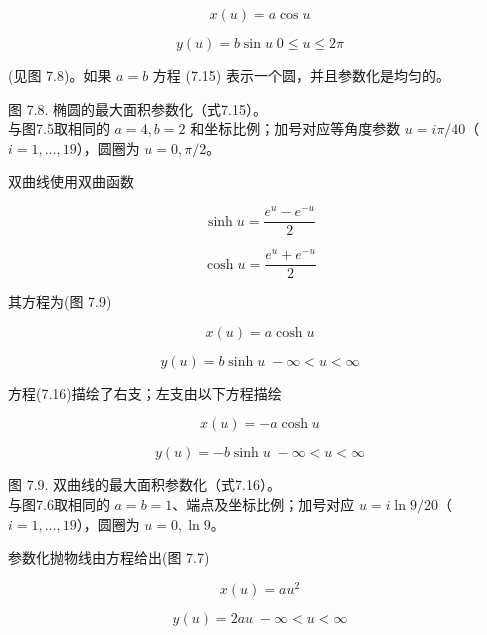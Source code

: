 \documentclass[../main.tex]{subfiles}
\begin{document}
\[
x\left( u\right)  = a\cos u
\]

\[
y\left( u\right)  = b\sin u\;0 \leq  u \leq  {2\pi } \tag{7.15}
\]

(见图 7.8)。如果 \(a = b\) 方程 (7.15) 表示一个圆，并且参数化是均匀的。

\begin{center}
\begin{minipage}{16cm}
\vspace*{.6\baselineskip}
\centering
{}
\par\smallskip
图 7.8. 椭圆的最大面积参数化（式7.15）。\\
与图7.5取相同的 $a=4,b=2$ 和坐标比例；加号对应等角度参数 $u=i\pi/40$（$i=1,\ldots,19$），圆圈为 $u=0,\pi/2$。
\end{minipage}
\end{center}

双曲线使用双曲函数

\[
\sinh u = \frac{{e}^{u} - {e}^{-u}}{2}
\]

\[
\cosh u = \frac{{e}^{u} + {e}^{-u}}{2}
\]

其方程为(图 7.9)

\[
x\left( u\right)  = a\cosh u
\]

\[
y\left( u\right)  = b\sinh u\; - \infty  < u < \infty  \tag{7.16}
\]

方程(7.16)描绘了右支；左支由以下方程描绘

\[
x\left( u\right)  =  - a\cosh u
\]

\[
y\left( u\right)  =  - b\sinh u\; - \infty  < u < \infty
\]





\begin{center}
\begin{minipage}{16cm}
\vspace*{.6\baselineskip}
\centering
{}
\par\smallskip
图 7.9. 双曲线的最大面积参数化（式7.16）。\\
与图7.6取相同的 $a=b=1$、端点及坐标比例；加号对应 $u=i\ln9/20$（$i=1,\ldots,19$），圆圈为 $u=0,\ln9$。
\end{minipage}
\end{center}

参数化抛物线由方程给出(图 7.7)

\[
x\left( u\right)  = a{u}^{2}
\]

\[
y\left( u\right)  = {2au}\; - \infty  < u < \infty  \tag{7.17}
\]
\end{document}
